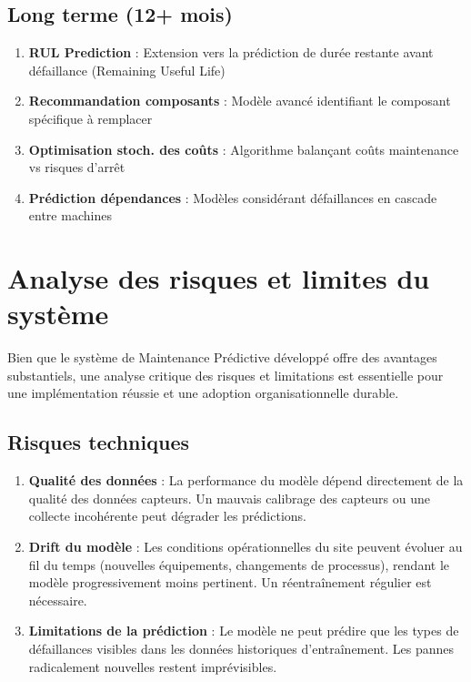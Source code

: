 \documentclass[a4paper,12pt,twoside]{report}
\begin{document}
\subsection{Long terme (12+ mois)}

\begin{enumerate}
    \item \textbf{RUL Prediction} : Extension vers la prédiction de durée restante avant défaillance (Remaining Useful Life)
    \item \textbf{Recommandation composants} : Modèle avancé identifiant le composant spécifique à remplacer
    \item \textbf{Optimisation stoch. des coûts} : Algorithme balançant coûts maintenance vs risques d'arrêt
    \item \textbf{Prédiction dépendances} : Modèles considérant défaillances en cascade entre machines
\end{enumerate}

\section{Analyse des risques et limites du système}

Bien que le système de Maintenance Prédictive développé offre des avantages substantiels, une analyse critique des risques et limitations est essentielle pour une implémentation réussie et une adoption organisationnelle durable.

\subsection{Risques techniques}

\begin{enumerate}
    \item \textbf{Qualité des données} : La performance du modèle dépend directement de la qualité des données capteurs. Un mauvais calibrage des capteurs ou une collecte incohérente peut dégrader les prédictions.
    
    \item \textbf{Drift du modèle} : Les conditions opérationnelles du site peuvent évoluer au fil du temps (nouvelles équipements, changements de processus), rendant le modèle progressivement moins pertinent. Un réentraînement régulier est nécessaire.
    
    \item \textbf{Limitations de la prédiction} : Le modèle ne peut prédire que les types de défaillances visibles dans les données historiques d'entraînement. Les pannes radicalement nouvelles restent imprévisibles.
\end{enumerate}
\end{document}
